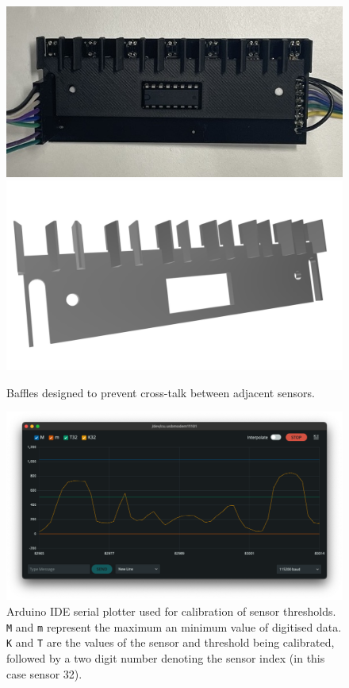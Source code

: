 \begin{figure}
    \centering
    \includegraphics[width=\linewidth]{src/images/sensor-board-w-baffles.jpeg}
    \\
    \includegraphics[width=\linewidth]{src/images/baffles.png}
    \caption{Baffles designed to prevent cross-talk between adjacent sensors.}
    \label{fig:baffles}
\end{figure}

\begin{figure}
    \centering
    \includegraphics[width=\linewidth]{src/images/serial_monitor.png}
    \caption{Arduino IDE serial plotter used for calibration of sensor thresholds. \texttt{M} and \texttt{m} represent the maximum an minimum value of digitised data. \texttt{K} and \texttt{T} are the values of the sensor and threshold being calibrated, followed by a two digit number denoting the sensor index (in this case sensor 32).}
    \label{fig:serial_monitor}
\end{figure}

